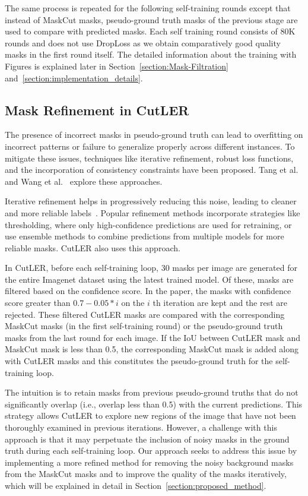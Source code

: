 The same process is repeated for the following self-training rounds except that instead of MaskCut masks, pseudo-ground truth masks of the previous stage are used to compare with predicted masks. Each self training round consists of 80K rounds and does not use DropLoss as we obtain comparatively good quality masks in the first round itself. The detailed information about the training with Figures is explained later in Section~\ref{section:Mask-Filtration} and~\ref{section:implementation_details}.

\subsection{Mask Refinement in CutLER}
\label{section:bg_mask_refinement}
The presence of incorrect masks in pseudo-ground truth can lead to overfitting on incorrect patterns or failure to generalize properly across different instances. To mitigate these issues, techniques like iterative refinement, robust loss functions, and the incorporation of consistency constraints have been proposed. Tang et al.~\cite{Tang_2018_CVPR} and Wang et al.~\cite{ziegler2022selfsupervisedlearningobjectparts} explore these approaches. 

Iterative refinement helps in progressively reducing this noise, leading to cleaner and more reliable labels~\cite{xie2020selftrainingnoisystudentimproves}. Popular refinement methods incorporate strategies like thresholding, where only high-confidence predictions are used for retraining, or use ensemble methods to combine predictions from multiple models for more reliable masks. CutLER also uses this approach.

In CutLER, before each self-training loop, 30 masks per image are generated for the entire Imagenet dataset using the latest trained model. Of these, masks are filtered based on the confidence score. In the paper, the masks with confidence score greater than \(0.7 - 0.05 * i\) on the \(i\) th iteration are kept and the rest are rejected. These filtered CutLER masks are compared with the corresponding MaskCut masks (in the first self-training round) or the pseudo-ground truth masks from the last round for each image. If the IoU between CutLER mask and MaskCut mask is less than 0.5, the corresponding MaskCut mask is added along with CutLER masks and this constitutes the pseudo-ground truth for the self-training loop.

The intuition is to retain masks from previous pseudo-ground truths that do not significantly overlap (i.e., overlap less than 0.5) with the current predictions. This strategy allows CutLER to explore new regions of the image that have not been thoroughly examined in previous iterations. However, a challenge with this approach is that it may perpetuate the inclusion of noisy masks in the ground truth during each self-training loop. Our approach seeks to address this issue by implementing a more refined method for removing the noisy background masks from the MaskCut masks and to improve the quality of the masks iteratively, which will be explained in detail in Section~\ref{section:proposed_method}.